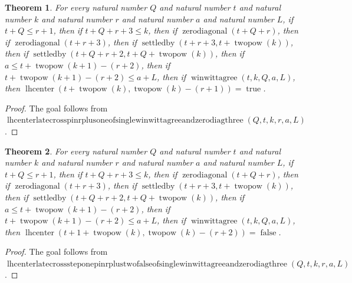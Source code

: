 \documentclass[11pt]{article}
\newtheorem{theorem}{Theorem}[section]
\theoremstyle{definition}
\begin{document}
\begin{theorem}
\label{ll:paper:lhcenter-late-cross-pin-r-plus-one-of-single-winwittagree-and-zero-diag-three}
For every natural number \(Q\) and natural number \(t\) and natural number \(k\) and natural number \(r\) and natural number \(a\) and natural number \(L\), if \(t + Q \le r + 1\), then if \(t + Q + r + 3 \le k\), then if \(\operatorname{zerodiagonal}(t + Q + r)\), then if \(\operatorname{zerodiagonal}(t + r + 3)\), then if \(\operatorname{settledby}(t + r + 3, t + \operatorname{twopow}(k))\), then if \(\operatorname{settledby}(t + Q + r + 2, t + Q + \operatorname{twopow}(k))\), then if \(a \le t + \operatorname{twopow}(k + 1) - (r + 2)\), then if \(t + \operatorname{twopow}(k + 1) - (r + 2) \le a + L\), then if \(\operatorname{winwittagree}(t, k, Q, a, L)\), then \(\operatorname{lhcenter}(t + \operatorname{twopow}(k), \operatorname{twopow}(k) - (r + 1)) = \operatorname{true}\).
\end{theorem}
\begin{proof}
The goal follows from \(\operatorname{lhcenterlatecrosspinrplusoneofsinglewinwittagreeandzerodiagthree}(Q, t, k, r, a, L)\).
\end{proof}
\begin{theorem}
\label{ll:paper:lhcenter-late-cross-step-one-pin-r-plus-two-false-of-single-winwittagree-and-zero-diag-three}
For every natural number \(Q\) and natural number \(t\) and natural number \(k\) and natural number \(r\) and natural number \(a\) and natural number \(L\), if \(t + Q \le r + 1\), then if \(t + Q + r + 3 \le k\), then if \(\operatorname{zerodiagonal}(t + Q + r)\), then if \(\operatorname{zerodiagonal}(t + r + 3)\), then if \(\operatorname{settledby}(t + r + 3, t + \operatorname{twopow}(k))\), then if \(\operatorname{settledby}(t + Q + r + 2, t + Q + \operatorname{twopow}(k))\), then if \(a \le t + \operatorname{twopow}(k + 1) - (r + 2)\), then if \(t + \operatorname{twopow}(k + 1) - (r + 2) \le a + L\), then if \(\operatorname{winwittagree}(t, k, Q, a, L)\), then \(\operatorname{lhcenter}(t + 1 + \operatorname{twopow}(k), \operatorname{twopow}(k) - (r + 2)) = \operatorname{false}\).
\end{theorem}
\begin{proof}
The goal follows from \(\operatorname{lhcenterlatecrosssteponepinrplustwofalseofsinglewinwittagreeandzerodiagthree}(Q, t, k, r, a, L)\).
\end{proof}
\end{document}
